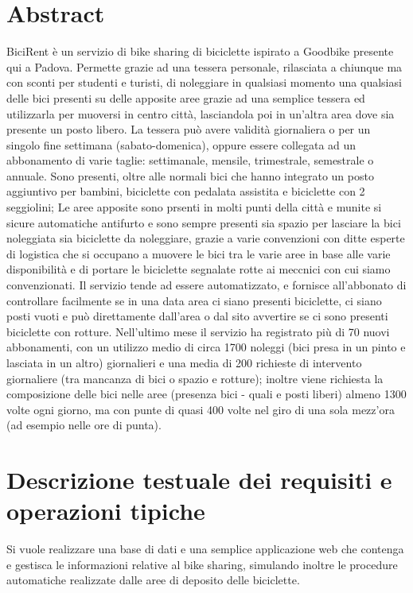 \documentclass[a4paper,twoside]{article}
\begin{document}
\section{Abstract}
BiciRent è un servizio di bike sharing di biciclette ispirato a Goodbike presente qui a Padova.\newline
Permette grazie ad una tessera personale, rilasciata a chiunque ma con sconti per studenti e turisti, di noleggiare in qualsiasi momento una qualsiasi delle bici presenti su delle apposite aree grazie ad una semplice tessera ed utilizzarla per muoversi in centro città, lasciandola poi in un'altra area dove sia presente un posto libero.\newline
La tessera può avere validità giornaliera o per un singolo fine settimana (sabato-domenica), oppure essere collegata ad un abbonamento di varie taglie: settimanale, mensile, trimestrale, semestrale o  annuale.\newline
Sono presenti, oltre alle normali bici che hanno integrato un posto aggiuntivo per bambini, biciclette con pedalata assistita e biciclette con 2 seggiolini;\newline
Le aree apposite sono prsenti in molti punti della città e munite si sicure automatiche antifurto e sono sempre presenti sia spazio per lasciare la bici noleggiata sia biciclette da noleggiare, grazie a varie convenzioni con ditte esperte di logistica che si occupano a muovere le bici tra le varie aree in base alle varie disponibilità e di portare le biciclette segnalate rotte ai meccnici con cui siamo convenzionati.\newline
Il servizio tende ad essere automatizzato, e fornisce all'abbonato di controllare facilmente se in una data area ci siano presenti biciclette, ci siano posti vuoti e può direttamente dall'area o dal sito avvertire se ci sono presenti biciclette con rotture.\newline
Nell'ultimo mese il servizio ha registrato più di 70 nuovi abbonamenti, con un utilizzo medio di circa 1700 noleggi (bici presa in un pinto e lasciata in un altro) giornalieri e una media di 200 richieste di intervento giornaliere (tra mancanza di bici o spazio e rotture);\newline
inoltre viene richiesta la composizione delle bici nelle aree (presenza bici - quali e posti liberi) almeno 1300 volte ogni giorno, ma con punte di quasi 400 volte nel giro di una sola mezz'ora (ad esempio nelle ore di punta).

\section{Descrizione testuale dei requisiti e operazioni tipiche}
Si vuole realizzare una base di dati e una semplice applicazione web che contenga e gestisca le informazioni relative al
bike sharing, simulando inoltre le procedure automatiche realizzate dalle aree di deposito delle biciclette.\newline
\end{document}
